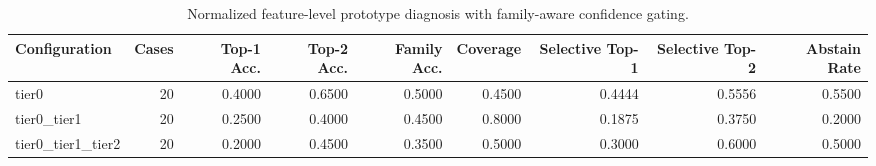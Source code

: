 \begin{table}[t]
\centering
\caption{Normalized feature-level prototype diagnosis with family-aware confidence gating.}
\label{tab:dice_stressor_hierarchical_diagnosis}
\footnotesize
\begin{tabular}{lrrrrrrrr}
\toprule
Configuration & Cases & Top-1 Acc. & Top-2 Acc. & Family Acc. & Coverage & Selective Top-1 & Selective Top-2 & Abstain Rate \\
\midrule
tier0 & 20 & 0.4000 & 0.6500 & 0.5000 & 0.4500 & 0.4444 & 0.5556 & 0.5500 \\
tier0_tier1 & 20 & 0.2500 & 0.4000 & 0.4500 & 0.8000 & 0.1875 & 0.3750 & 0.2000 \\
tier0_tier1_tier2 & 20 & 0.2000 & 0.4500 & 0.3500 & 0.5000 & 0.3000 & 0.6000 & 0.5000 \\
\bottomrule
\end{tabular}

\end{table}
